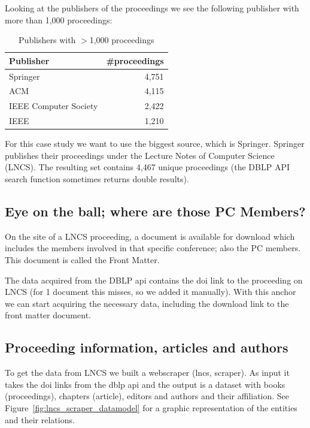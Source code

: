 \documentclass{ou-report}
\begin{document}
Looking at the publishers of the proceedings we see the following publisher with 
more than 1,000 proceedings:
\begin{table}[h]
    \caption{Publishers with $>$1,000 proceedings}
    \begin{tabular}{ lr }
        \toprule
        Publisher & \#proceedings \\
        \midrule
        Springer              & 4,751 \\
        ACM                   & 4,115 \\
        IEEE Computer Society & 2,422 \\
        IEEE                  & 1,210 \\
        \bottomrule
    \end{tabular}
    \label{tbl:publisher-proceeding-count}
\end{table}
For this case study we want to use the biggest source, which is Springer. 
Springer publishes their proceedings under the Lecture 
Notes of Computer Science (LNCS). The resulting set contains 4,467 unique 
proceedings (the DBLP API search function sometimes returns double results).

\subsection{Eye on the ball; where are those PC Members?}
On the site of a LNCS proceeding, a document is available for download which 
includes the members involved in that specific conference; also the PC members. This 
document is called the Front Matter.

The data acquired from the DBLP api contains the doi link to 
the proceeding on LNCS (for 1 document this misses, so we added it manually). 
With this anchor we can start acquiring the necessary data, including the 
download link to the front matter document.

\subsection{Proceeding information, articles and authors}
\label{subsec:springer_website}
To get the data from LNCS we built a webscraper (lncs, scraper). As input it 
takes the doi links from the dblp api and the output is a dataset with books 
(proceedings), chapters (article), editors and authors and their affiliation. 
See Figure~\ref{fig:lncs_scraper_datamodel} for a graphic representation of the 
entities and their relations.
\end{document}
